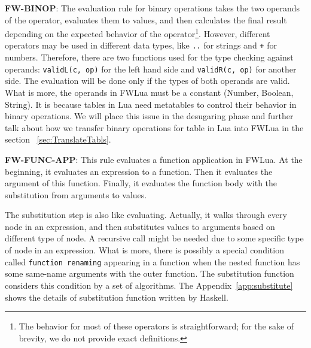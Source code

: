 {\bf FW-BINOP}: The evaluation rule for binary operations takes the two operands of the operator, evaluates them to values, and then calculates the final result depending on the expected behavior of the operator\footnote{
  The behavior for most of these operators is straightforward;
  for the sake of brevity, we do not provide exact definitions.
}.
However, different operators may be used in different data types, like {\tt ..} for strings and {\tt +} for numbers. Therefore, there are two functions used for the type checking against operands: {\tt validL(c, op)} for the left hand side and {\tt validR(c, op)} for another side. The evaluation will be done only if the types of both operands are valid.
What is more, the operands in FWLua must be a constant (Number, Boolean, String). It is because tables in Lua need metatables to control their behavior in binary operations. We will place this issue in the desugaring phase and further talk about how we transfer binary operations for table in Lua into FWLua in the section ~\ref{sec:TranslateTabls}.

{\bf FW-FUNC-APP}: This rule evaluates a function application in FWLua. At the beginning, it evaluates an expression to a function. Then it evaluates the argument of this function.  Finally, it evaluates the function body with the substitution from arguments to values. 

The substitution step is also like evaluating. Actually, it walks through every node in an expression, and then substitutes values to arguments based on different type of node. A recursive call might be needed due to some specific type of node in an expression.
What is more, there is possibly a special condition called {\tt function renaming} appearing in a function when the nested function has some same-name arguments with the outer function. The substitution function considers this condition by a set of algorithms. The Appendix~\ref{app:substitute} shows the details of substitution function written by Haskell.



